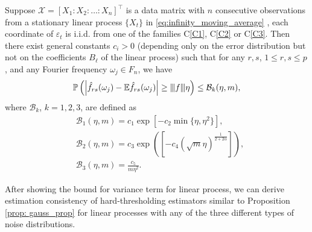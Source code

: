 \begin{prop}
\label{prop:heavy_tail_bound_variance}
Suppose $\mathcal{X} = [X_1:X_2:\ldots:X_n]^\top$ is a data matrix with $n$ consecutive observations from  a stationary linear process  $\{X_t\}$ in  \eqref{eq:infinity_moving_average} , each coordinate of $\varepsilon_t$ is i.i.d. from one of the families C\ref{C1}, C\ref{C2} or  C\ref{C3}. Then there exist  general constants $c_i > 0$ (depending only on the error distribution but not on the coefficients $B_\ell$ of the linear process) 
such that  for any $r, s$, $1 \le r, s \le p$, and any Fourier frequency $\omega_j \in F_n$, we have 
\begin{equation}\label{eqn:heavy-tail-conc-entrywise}
\mathbb{P}\left(\left|\hat{f}_{rs}(\omega_j) - \mathbb{E}\hat{f}_{rs}(\omega_j)\right| \ge {\left\vert\kern-0.25ex\left\vert\kern-0.25ex\left\vert f \right\vert\kern-0.25ex\right\vert\kern-0.25ex\right\vert}\eta\right)\le \mathcal{B}_k(\eta, m),
\end{equation} 
where $\mathcal{B}_k$, $k=1, 2, 3$, are defined as 
\begin{equation}
\begin{aligned}
& \mathcal{B}_1(\eta, m) = c_1\exp\left[-c_2\min\{\eta, \eta^2\}\right],\\
& \mathcal{B}_2(\eta, m) = c_3\exp(\left[-c_4\left(\sqrt{m}\eta\right)^{\frac{1}{2+2\alpha}}\right]),\\
& \mathcal{B}_3(\eta, m) = \frac{c_5}{m\eta^2}.\nonumber
\end{aligned}
\end{equation}
\end{prop}
After showing the bound for variance term for linear process, we can derive estimation consistency of hard-thresholding estimators similar to Proposition \ref{prop: gauss_prop} for linear processes with any of the three different types of noise distributions. 

